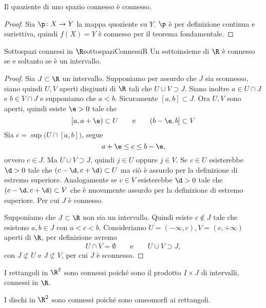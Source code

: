 \begin{pr}\label{pr:conn4}
	Il quoziente di uno spazio connesso è connesso.
\end{pr}

\begin{proof}
	Sia \(\p\colon X \to Y\) la mappa quoziente su \(Y\).
	\(\p\) è per definizione continua e suriettiva, quindi \(f(X)=Y\) è connesso per il teorema fondamentale.
\end{proof}

\begin{prop}{Sottospazi connessi in \(\R\)}{sottospaziConnessiR}
	Un sottoinsieme di \(\R\) è connesso se e soltanto se è un intervallo.
\end{prop}

\begin{proof}
	\graffito{\(\Leftarrow)\)}Sia \(J\subset \R\) un intervallo.
	Supponiamo per assurdo che \(J\) sia sconnesso, siano quindi \(U,V\) aperti disgiunti di \(\R\) tali che \(U\cup V \supset J\).
	Siano inoltre \(a\in U\cap J\) e \(b\in V\cap J\) e supponiamo che \(a<b\).
	Sicuramente \([a,b]\subset J\).
	Ora \(U,V\) sono aperti, quindi esiste \(\e>0\) tale che
	\[
		[a,a+\e)\subset U \qquad\text{e}\qquad (b-\e,b]\subset V
	\]
	Sia \(c = \sup \big( U\cap [a,b] \big)\), segue
	\[
		a+\e \le c \le b-\e,
	\]
	ovvero \(c\in J\).
	Ma \(U\cup V\supset J\), quindi \(j\in U\) oppure \(j\in V\).
	Se \(c\in U\) esisterebbe \(\d>0\) tale che \((c-\d,c+\d)\subset U\) ma ciò è assurdo per la definizione di estremo superiore.
	Analogamente se \(c\in V\) esisterebbe \(\d>0\) tale che \((c-\d,c+\d)\subset V\) che è nuovamente assurdo per la definizione di estremo superiore.
	Per cui \(J\) è connesso.

	\graffito{\(\Rightarrow)\)}Supponiamo che \(J\subset \R\) non sia un intervallo.
	Quindi esiste \(c\notin J\) tale che esistono \(a,b\in J\) con \(a<c<b\).
	Consideriamo \(U=(-\infty,c),V=(c,+\infty)\) aperti di \(\R\), per definizione avremo
	\[
		U\cap V = \emptyset \qquad\text{e}\qquad U\cup V \supset J,
	\]
	con \(J\not\subset U\) e \(J\not\subset V\), per cui \(J\) è sconnesso.
\end{proof}

\begin{ese}
	I rettangoli in \(\R^2\) sono connessi poiché sono il prodotto \(I\times J\) di intervalli, connessi in \(\R\).
\end{ese}

\begin{ese}
	I dischi in \(\R^2\) sono connessi poiché sono omeomorfi ai rettangoli.
\end{ese}

